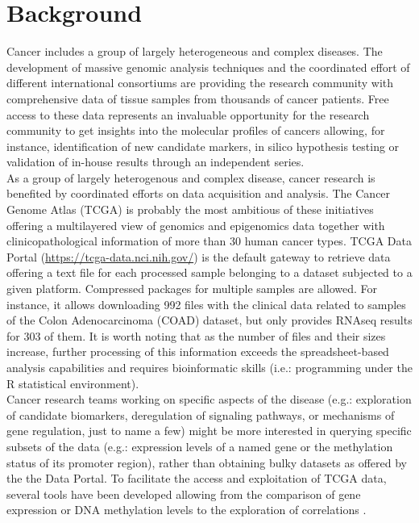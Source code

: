 \documentclass{bmcart}
\begin{document}


\section*{Background}



Cancer includes a group of largely heterogeneous and complex diseases. The development of massive genomic analysis techniques and the coordinated effort of different international consortiums are providing the research community with comprehensive data of tissue samples from thousands of cancer patients. Free access to these data represents an invaluable opportunity for the research community to get insights into the molecular profiles of cancers allowing, for instance, identification of new candidate markers, in silico hypothesis testing or validation of in-house results through an independent series.\\


As a group of largely heterogenous and complex disease, cancer research is benefited by coordinated efforts on data acquisition and analysis. The Cancer Genome Atlas (TCGA) \cite{zhang2011international} is probably the most ambitious of these initiatives offering a multilayered view of genomics and epigenomics data together with clinicopathological information of more than 30 human cancer types. TCGA Data Portal (\url{https://tcga-data.nci.nih.gov/}) is the default gateway to retrieve data offering a text file for each processed sample belonging to a dataset subjected to a given platform. Compressed packages for multiple samples are allowed. For instance, it allows downloading 992 files with the clinical data related to samples of the Colon Adenocarcinoma (COAD) dataset, but only provides RNAseq results for 303 of them. It is worth noting that as the number of files and their sizes increase, further processing of this information exceeds the spreadsheet-based analysis capabilities and requires bioinformatic skills (i.e.: programming under the R statistical environment).\\

Cancer research teams working on specific aspects of the disease (e.g.: exploration of candidate biomarkers, deregulation of signaling pathways, or mechanisms of gene regulation, just to name a few) might be more interested in querying specific subsets of the data (e.g.: expression levels of a named gene or the methylation status of its promoter region), rather than obtaining bulky datasets as offered by the the Data Portal. To facilitate the access and exploitation of TCGA data, several tools have been developed allowing from the comparison of gene expression or DNA methylation levels to the exploration of correlations \cite{plass2013mutations,schroeder2013visualizing}.\\
\end{document}
